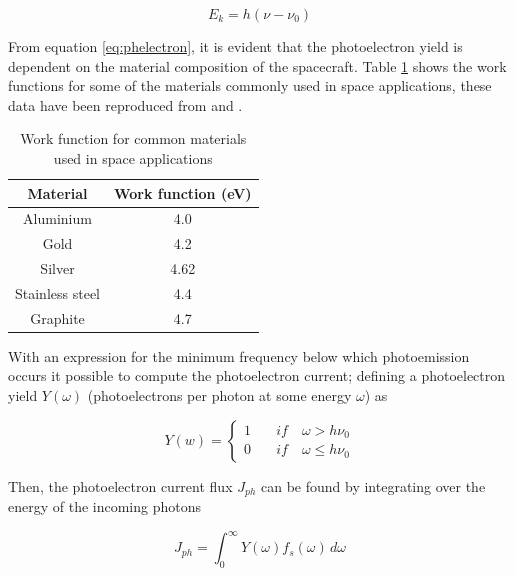 \begin{equation}\label{eq:phfreq}
    E_{k} = h(\nu - \nu_0)
\end{equation}

From equation \ref{eq:phelectron}, it is evident that the photoelectron yield is dependent on the material composition of the spacecraft. Table \ref{tab:workfunc} shows the work functions for some of the materials commonly used in space applications, these data have been reproduced from  and .

\begin{table}[h!]
    \centering
    \begin{tabular}{|c|c|}
        \hline
        \textbf{Material} & \textbf{Work function (eV)} \\ \hline
        Aluminium         & 4.0                    \\ \hline
        Gold              & 4.2                    \\ \hline
        Silver            & 4.62                   \\ \hline
        Stainless steel   & 4.4                    \\ \hline
        Graphite          & 4.7                    \\ \hline
    \end{tabular}
    \caption{Work function for common materials used in space applications}
    \label{tab:workfunc}
\end{table}

With an expression for the minimum frequency below which photoemission occurs it possible to compute the photoelectron current; defining a photoelectron yield $Y(\omega)$  (photoelectrons per photon at some energy $\omega$) as

\begin{equation} \label{eq:naivePhYield}
    Y(w) = 
    \begin{cases}
        1 \quad& if \quad \omega > h \nu_0 \\
        0 \quad& if \quad \omega \leqslant h \nu_0
    \end{cases}
\end{equation}


Then, the photoelectron current flux $J_{ph}$ can be found by integrating over the energy of the incoming photons 

\begin{equation}\label{eq:phCurrentNaive}
    J_{ph} = \int^\infty_0 Y(\omega) f_s(\omega) \, d\omega
\end{equation}


